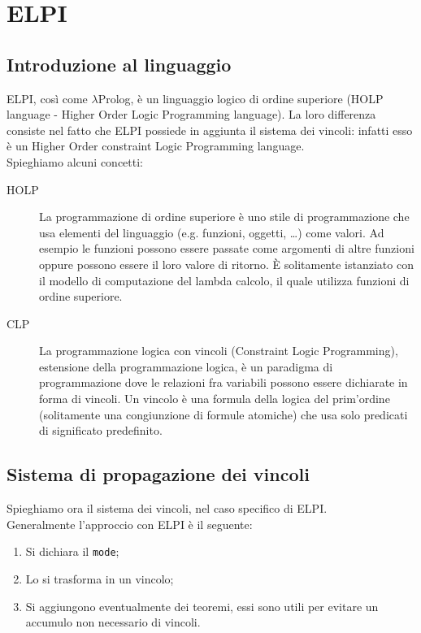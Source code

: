 \documentclass[12pt,a4paper,openright,twoside]{report}
\begin{document}
\section{ELPI}

\subsection{Introduzione al linguaggio}
ELPI, così come $\lambda$Prolog, è un linguaggio logico di ordine superiore (HOLP language - Higher Order Logic Programming language). La loro differenza consiste nel fatto che ELPI possiede in aggiunta il sistema dei vincoli: infatti esso è un Higher Order constraint Logic Programming language.\\
Spieghiamo alcuni concetti:
\begin{description}
 \item[HOLP] La programmazione di ordine superiore è uno stile di programmazione che usa elementi del linguaggio (e.g. funzioni, oggetti, \ldots) come valori. Ad esempio le funzioni possono essere passate come argomenti di altre funzioni oppure possono essere il loro valore di ritorno. È solitamente istanziato con il modello di computazione del lambda calcolo, il quale utilizza funzioni di ordine superiore.
 \item[CLP] La programmazione logica con vincoli (Constraint Logic Programming), estensione della programmazione logica, è un paradigma di programmazione dove le relazioni fra variabili possono essere dichiarate in forma di vincoli. Un vincolo è una formula della logica del prim'ordine (solitamente una congiunzione di formule atomiche) che usa solo predicati di significato predefinito.
\end{description}

\subsection{Sistema di propagazione dei vincoli}
Spieghiamo ora il sistema dei vincoli, nel caso specifico di ELPI.\\
Generalmente l'approccio con ELPI è il seguente:
\begin{enumerate}
 \item Si dichiara il \verb"mode";
 \item Lo si trasforma in un vincolo;
 \item Si aggiungono eventualmente dei teoremi, essi sono utili per evitare un accumulo non necessario di vincoli.
\end{enumerate}
\end{document}
